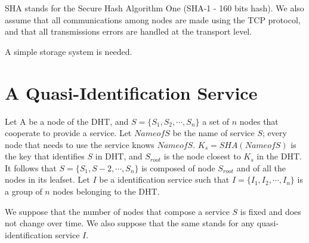 SHA stands for the Secure Hash Algorithm One (SHA-1 - 160 bits hash). We also
assume that all communications among nodes are made using the TCP protocol, and
that all transmissions errors are handled at the transport level.

A simple storage system is needed.






\section{A Quasi-Identification Service}


Let A be a node of the DHT, and $S = \{S_1, S_2, \cdots, S_n\}$ a set of $n$
nodes that cooperate to provide a service. Let $NameofS$ be the name of service
$S$; every node that needs to use the service knows $NameofS$. $K_s =
SHA(NameofS)$ is the key that identifies $S$ in DHT, and $S_{root}$ is the node
closest to $K_s$ in the DHT. It follows that $S = \{S_1, S-2, \cdots, S_n\}$ is
composed of node $S_{root}$ and of all the nodes in its leafset. Let $I$ be a
identification service such that $I = \{ I_1, I_2, \cdots, I_n\}$ is a group of
$n$ nodes belonging to the DHT. 


We suppose that the number of nodes that compose a service $S$ is fixed and does
not change over time. We also suppose that the same stands for any
quasi-identification service $I$.



